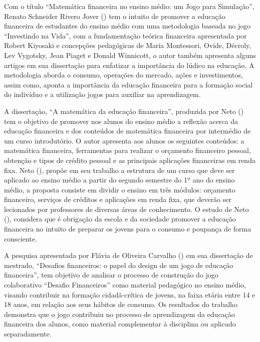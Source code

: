 Com o título “Matemática financeira no ensino médio: um Jogo para Simulação”, Renato Schneider Rivero Jover (\citeyear{jover2014}) tem o intuito de promover a educação financeira de estudantes do ensino médio com uma metodologia baseada no jogo “Investindo na Vida”, com a fundamentação teórica financeira apresentada por Robert Kiyosaki e concepções pedagógicas de Maria Montessori, Ovide, Décroly, Lev Vygotsky, Jean Piaget e Donald Winnicott, o autor também apresenta alguns artigos em sua dissertação para enfatizar a importância do lúdico na educação. A metodologia aborda o consumo, operações do mercado, ações e investimentos, assim como, aponta a importância da educação financeira para a formação social do indivíduo e a utilização jogos para auxiliar na aprendizagem.

A dissertação, “A matemática da educação financeira”, produzida por Neto (\citeyear{andreatini-neto2015}) tem o objetivo de promover nos alunos do ensino médio a reflexão acerca da educação financeira e dos conteúdos de matemática financeira por intermédio de um curso introdutório. O autor apresenta aos alunos os seguintes conteúdos: a matemática financeira, ferramentas para realizar o orçamento financeiro pessoal, obtenção e tipos de crédito pessoal e as principais aplicações financeiras em renda fixa. Neto (\citeyear{andreatini-neto2015}), propõe em seu trabalho a estrutura de um curso que deve ser aplicado ao ensino médio a partir do segundo semestre do 1º ano do ensino médio, a proposta consiste em dividir o ensino em três módulos: orçamento financeiro, serviços de créditos e aplicações em renda fixa, que deverão ser lecionados por professores de diversas áreas de conhecimento. O estudo de Neto (\citeyear{andreatini-neto2015}), considera que é obrigação da escola e da sociedade promover a educação financeira no intuito de preparar os jovens para o consumo e poupança de forma consciente.

A pesquisa apresentada por Flávia de Oliveira Carvalho (\citeyear{flavia2016}) em sua dissertação de mestrado, “Desafios financeiros: o papel do design de um jogo de educação financeira”, tem objetivo de analisar o processo de construção do jogo colaborativo “Desafio Financeiros” como material pedagógico no ensino médio, visando contribuir na formação cidadã-crítica de jovens, na faixa etária entre 14 e 18 anos, em relação aos seus hábitos de consumo. Os resultados do trabalho demonstra que o jogo contribuiu no processo de aprendizagem da educação financeira dos alunos, como material complementar à disciplina ou aplicado separadamente.

